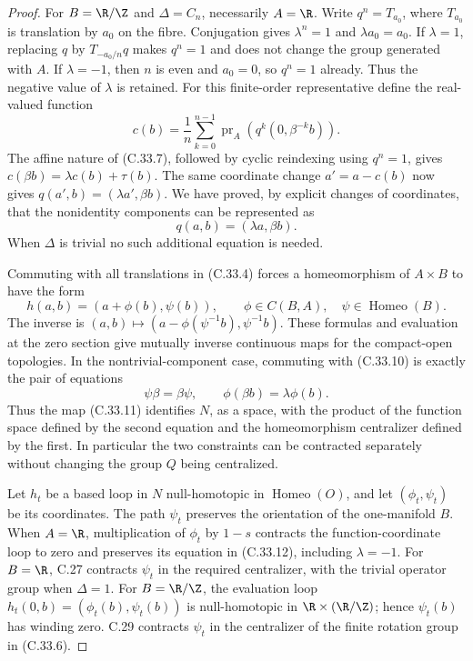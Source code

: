 \begin{proof}
For $B=\R/\Z$ and $\Delta=C_n$, necessarily $A=\R$.
Write $q^n=T_{a_0}$, where $T_{a_0}$ is translation by $a_0$
on the fibre. Conjugation gives $\lambda^n=1$ and
$\lambda a_0=a_0$.
If $\lambda=1$, replacing $q$ by $T_{-a_0/n}q$ makes
$q^n=1$ and does not change the group generated with $A$.
If $\lambda=-1$, then $n$ is even and $a_0=0$, so $q^n=1$
already. Thus the negative value of $\lambda$ is retained.
For this finite-order representative define the real-valued
function
\[
 c(b)=\frac1n\sum_{k=0}^{n-1}
      \operatorname{pr}_A\!\left(q^k(0,\beta^{-k}b)\right).
                                                        \tag{C.33.9}
\]
The affine nature of (C.33.7), followed by cyclic
reindexing using $q^n=1$, gives
$c(\beta b)=\lambda c(b)+\tau(b)$.
The same coordinate change $a'=a-c(b)$ now gives
$q(a',b)=(\lambda a',\beta b)$.
We have proved, by explicit changes of coordinates, that
the nonidentity components can be represented as
\[
                         q(a,b)=(\lambda a,\beta b).
                                                       \tag{C.33.10}
\]
When $\Delta$ is trivial no such additional equation is needed.

Commuting with all translations in (C.33.4) forces a
homeomorphism of $A\times B$ to have the form
\[
       h(a,b)=(a+\phi(b),\psi(b)),\qquad
       \phi\in C(B,A),\quad\psi\in\operatorname{Homeo}(B).
                                                       \tag{C.33.11}
\]
The inverse is
$(a,b)\mapsto(a-\phi(\psi^{-1}b),\psi^{-1}b)$.
These formulas and evaluation at the zero section give
mutually inverse continuous maps for the compact-open
topologies. In the nontrivial-component case, commuting
with (C.33.10) is exactly the pair of equations
\[
             \psi\beta=\beta\psi,\qquad
             \phi(\beta b)=\lambda\phi(b).
                                                       \tag{C.33.12}
\]
Thus the map (C.33.11) identifies $N$, as a space, with
the product of the function space defined by the second
equation and the homeomorphism centralizer defined by the
first. In particular the two constraints can be contracted
separately without changing the group $Q$ being centralized.

Let $h_t$ be a based loop in $N$ null-homotopic in
$\operatorname{Homeo}(O)$, and let $(\phi_t,\psi_t)$ be its
coordinates. The path $\psi_t$ preserves the orientation of
the one-manifold $B$.
When $A=\R$, multiplication of $\phi_t$ by $1-s$ contracts
the function-coordinate loop to zero and preserves its
equation in (C.33.12), including $\lambda=-1$.
For $B=\R$, C.27 contracts $\psi_t$ in the required
centralizer, with the trivial operator group when
$\Delta=1$. For $B=\R/\Z$, the evaluation loop
$h_t(0,b)=(\phi_t(b),\psi_t(b))$ is null-homotopic in
$\R\times(\R/\Z)$; hence $\psi_t(b)$ has winding zero.
C.29 contracts $\psi_t$ in the centralizer of the finite
rotation group in (C.33.6).


\end{proof}
